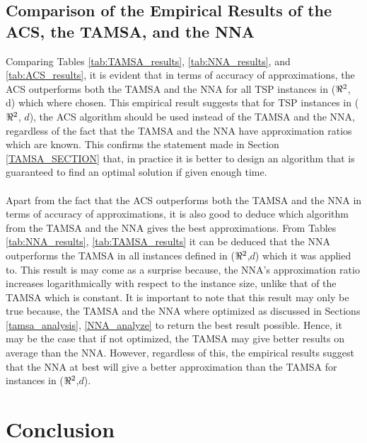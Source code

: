\documentclass{article}
\begin{document}
\subsection{Comparison of the Empirical Results of the ACS, the TAMSA, and the NNA}
Comparing Tables \ref{tab:TAMSA_results}, \ref{tab:NNA_results}, and \ref{tab:ACS_results}, it is evident that in terms of accuracy of approximations, the ACS outperforms both the TAMSA and the NNA for all TSP instances in ($\real^2$, d) which where chosen. This empirical result suggests that for TSP instances in ($\real^2$, $d$), the ACS algorithm should be used instead of the TAMSA and the NNA, regardless of the fact that the TAMSA and the NNA have approximation ratios which are known. This confirms the statement made in Section \ref{TAMSA_SECTION} that, in practice it is better to design an algorithm that is guaranteed to find an optimal solution if given enough time.\\\\
Apart from the fact that the ACS outperforms both the TAMSA and the NNA in terms of accuracy of approximations, it is also good to deduce which algorithm from the TAMSA and the NNA gives the best approximations. From Tables \ref{tab:NNA_results}, \ref{tab:TAMSA_results} it can be deduced that the NNA outperforms the TAMSA in all instances defined in ($\real^2$,$d$) which it was applied to. This result is may come as a surprise because, the NNA's approximation ratio increases logarithmically with respect to the instance size, unlike that of the TAMSA which is constant. It is important to note that this result may only be true because, the TAMSA and the NNA where optimized as discussed in Sections \ref{tamsa_analysis}, \ref{NNA_analyze} to return the best result possible. Hence, it may be the case that if not optimized, the TAMSA may give better results on average than the NNA. However, regardless of this, the empirical results suggest that the NNA at best will give a better approximation than the TAMSA for instances in ($\real^2$,$d$).
\newpage
\section{Conclusion}
\newpage

\nocite{*}

\end{document}
